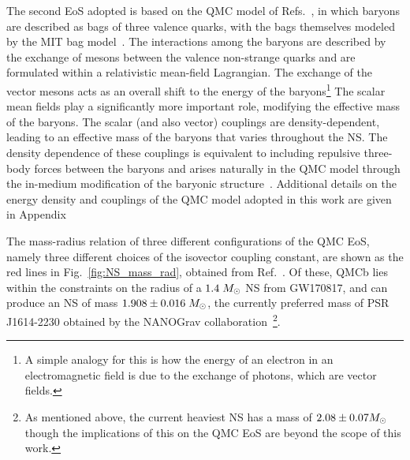 The second EoS adopted is based on the QMC model of Refs.~\cite{Guichon:1987jp_Possiblequarkmechanism,Guichon:1995ue_Rolenucleonstructure, Saito:2005rv_Nucleonhadronstructure,Guichon:2018uew_QuarkMesonCouplingQMC}, in which baryons are described as bags of three valence quarks, with the bags themselves modeled by the MIT bag model~\cite{Chodos:1974pn_Baryonstructurebag}. The interactions among the baryons are described by the exchange of mesons between the valence non-strange quarks and are formulated within a relativistic mean-field Lagrangian. The exchange of the vector mesons acts as an overall shift to the energy of the baryons\footnote{A simple analogy for this is how the energy of an electron in an electromagnetic field is due to the exchange of photons, which are vector fields.} The scalar mean fields play a significantly more important role, modifying the effective mass of the baryons. The scalar (and also vector) couplings are density-dependent, leading to an effective mass of the baryons that varies throughout the NS. The density dependence of these couplings is equivalent to including repulsive three-body forces between the baryons and arises naturally in the QMC model through the in-medium modification of the baryonic structure~\cite{Guichon:2004xg_Quarkstructurenuclear,Thomas:2021kio_jul_Rolequarksnuclear}. Additional details on the energy density and couplings of the QMC model adopted in this work are given in Appendix~

The mass-radius relation of three different configurations of the QMC EoS, namely three different choices of the isovector coupling constant, are shown as the red lines in Fig.~\ref{fig:NS_mass_rad}, obtained from Ref.~\cite{Motta:2019tjc_Isovectoreffectsneutron}. Of these, QMCb lies within the constraints on the radius of a $1.4\;M_\odot$ NS from GW170817, and can produce an NS of mass $1.908 \pm 0.016\;M_\odot$, the currently preferred mass of PSR J1614-2230 obtained by the NANOGrav collaboration~\cite{NANOGrav:2017wvv_apr_NANOGrav11yearData}\footnote{As mentioned above, the current heaviest NS has a mass of $2.08\pm 0.07M_\odot$ though the implications of this on the QMC EoS are beyond the scope of this work.}.

